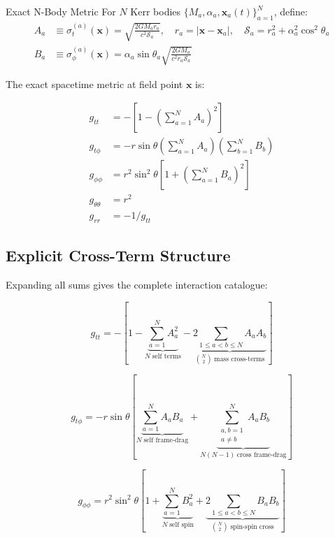 \documentclass[11pt,a4paper]{article}
\theoremstyle{definition}
\theoremstyle{remark}
\newcommand{\sig}[2]{\sigma_{#1}^{(#2)}}
\newcommand{\boldx}{\mathbf{x}}
\begin{document}
	Exact N-Body Metric
		For $N$ Kerr bodies $\{M_a,\alpha_a,\boldx_a(t)\}_{a=1}^N$, define:
		\begin{align}
			A_a &\equiv \sig{t}{a}(\boldx)
			= \sqrt{\frac{2GM_ar_a}{c^2\mathcal{S}_a}},\quad
			r_a=|\boldx-\boldx_a|,\quad
			\mathcal{S}_a=r_a^2+\alpha_a^2\cos^2\theta_a\\[4pt]
			B_a &\equiv \sig{\phi}{a}(\boldx)
			= \alpha_a\sin\theta_a\sqrt{\frac{2GM_a}{c^2r_a\mathcal{S}_a}}
		\end{align}
		
		The exact spacetime metric at field point $\boldx$ is:
		
		\begin{align}
			g_{tt} &= -\left[1 - \left(\sum_{a=1}^N A_a\right)^2\right]
			\label{eq:gtt_N}\\[6pt]
			g_{t\phi} &= -r\sin\theta\left(\sum_{a=1}^N A_a\right)\!\left(\sum_{b=1}^N B_b\right)
			\label{eq:gtphi_N}\\[6pt]
			g_{\phi\phi} &= r^2\sin^2\!\theta\left[1+\left(\sum_{a=1}^N B_a\right)^2\right]
			\label{eq:gphiphi_N}\\[6pt]
			g_{\theta\theta} &= r^2\\[4pt]
			g_{rr} &= -1/g_{tt}
			\label{eq:grr_N}
		\end{align}
	
	\subsection{Explicit Cross-Term Structure}
	
	Expanding all sums gives the complete interaction catalogue:
	
	\begin{equation}\label{eq:gtt_N_expanded}
		g_{tt} = -\left[
		1
		-\underbrace{\sum_{a=1}^N A_a^2}_{N\;\text{self terms}}
		-\underbrace{2\sum_{1\le a<b\le N}A_a A_b}_{\binom{N}{2}\;\text{mass cross-terms}}
		\right]
	\end{equation}
	
	\begin{equation}\label{eq:gtphi_N_expanded}
		g_{t\phi} = -r\sin\theta\!\left[
		\underbrace{\sum_{a=1}^N A_a B_a}_{N\;\text{self frame-drag}}
		+\underbrace{\sum_{\substack{a,b=1\\a\ne b}}^N A_a B_b}_{N(N-1)\;\text{cross frame-drag}}
		\right]
	\end{equation}
	
	\begin{equation}\label{eq:gphiphi_N_expanded}
		g_{\phi\phi} = r^2\sin^2\!\theta\!\left[
		1
		+\underbrace{\sum_{a=1}^N B_a^2}_{N\;\text{self spin}}
		+\underbrace{2\sum_{1\le a<b\le N}B_a B_b}_{\binom{N}{2}\;\text{spin-spin cross}}
		\right]
	\end{equation}
	
\end{document}
